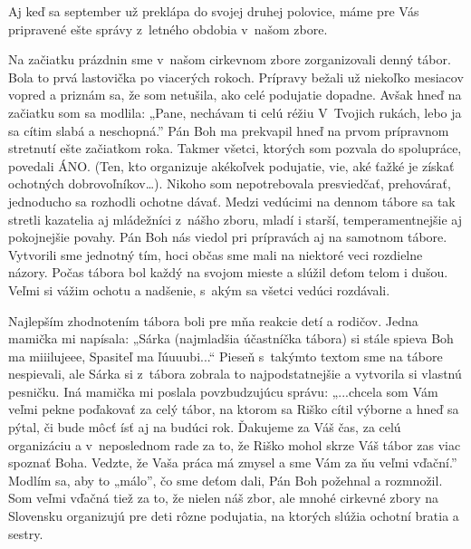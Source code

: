 \def\velkostpisma{9}
\def\velkostriadku{12}



Aj keď sa september už preklápa do svojej druhej polovice, máme pre Vás pripravené ešte správy z~letného obdobia v~našom zbore.


Na začiatku prázdnin sme v~našom cirkevnom zbore zorganizovali denný tábor.
Bola to prvá lastovička po viacerých rokoch. Prípravy bežali už niekoľko mesiacov vopred a priznám sa, že som netušila, ako celé podujatie dopadne. Avšak hneď na začiatku som sa modlila: „Pane, nechávam ti celú réžiu V~Tvojich rukách, lebo ja sa cítim slabá a neschopná.” Pán Boh ma prekvapil hneď na prvom prípravnom stretnutí ešte začiatkom roka. Takmer všetci, ktorých som pozvala do spolupráce, povedali ÁNO. (Ten, kto organizuje akékoľvek podujatie, vie, aké ťažké je získať ochotných dobrovoľníkov…). Nikoho som nepotrebovala presviedčať, prehovárať, jednoducho sa rozhodli ochotne dávať. Medzi vedúcimi na dennom tábore sa tak stretli kazatelia aj mládežníci z~nášho zboru, mladí i starší, temperamentnejšie aj pokojnejšie povahy. Pán Boh nás viedol pri prípravách aj na samotnom tábore. Vytvorili sme jednotný tím, hoci občas sme mali na niektoré veci rozdielne názory. Počas tábora bol každý na svojom mieste a slúžil deťom telom i dušou. Veľmi si vážim ochotu a nadšenie, s~akým sa všetci vedúci rozdávali.

Najlepším zhodnotením tábora boli pre mňa reakcie detí a rodičov. Jedna mamička mi napísala: „Sárka (najmladšia účastníčka tábora) si stále spieva Boh ma miiilujeee, Spasiteľ ma ľúuuubi...“ Pieseň s~takýmto textom sme na tábore nespievali, ale Sárka si z~tábora zobrala to najpodstatnejšie a vytvorila si vlastnú pesničku. Iná mamička mi poslala povzbudzujúcu správu: „...chcela som Vám veľmi pekne
poďakovať za celý tábor, na ktorom sa Riško cítil výborne a hneď sa pýtal, či bude môcť ísť aj na budúci rok. Ďakujeme za Váš čas, za celú organizáciu a
v~neposlednom rade za to, že Riško mohol skrze Váš tábor zas viac spoznať Boha. Vedzte, že Vaša práca má zmysel a sme Vám za ňu veľmi vďační.” Modlím sa, aby to „málo”, čo sme deťom dali, Pán Boh požehnal a rozmnožil.
Som veľmi vďačná tiež za to, že nielen náš zbor, ale mnohé cirkevné zbory na Slovensku organizujú pre deti rôzne podujatia, na ktorých slúžia ochotní bratia a sestry.


